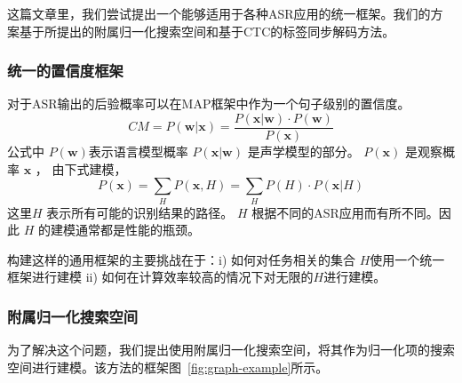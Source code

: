 这篇文章里，我们尝试提出一个能够适用于各种ASR应用的统一框架。我们的方案基于所提出的附属归一化搜索空间和基于CTC的标签同步解码方法。

  \subsubsection{统一的置信度框架}
  对于ASR输出的后验概率可以在MAP框架中作为一个句子级别的置信度。
  \begin{equation}\label{eq:cm-post}
        CM=P(\mathbf{w}|\mathbf{x}) =
         \frac{P(\mathbf{x}|\mathbf{w})\cdot P(\mathbf{w})}{P(\mathbf{x})}
  \end{equation}
 公式中 $P(\mathbf{w})$表示语言模型概率 $P(\mathbf{x}|\mathbf{w})$  是声学模型的部分。 $P(\mathbf{x})$ 是观察概率 $\mathbf{x}$ ， 由下式建模，
   \begin{equation}\label{eq:cm-obser}
        P(\mathbf{x})=\sum_H P(\mathbf{x},H)= \sum_H P(H) \cdot  P(\mathbf{x}|H)
  \end{equation}
 这里$H$ 表示所有可能的识别结果的路径。 $H$ 根据不同的ASR应用而有所不同。因此 $H$ 的建模通常都是性能的瓶颈。

构建这样的通用框架的主要挑战在于：i) 如何对任务相关的集合 $H$使用一个统一框架进行建模 ii) 如何在计算效率较高的情况下对无限的$H$进行建模。


 \subsubsection{附属归一化搜索空间}
 \label{Sec:norm-graph-detail}

 为了解决这个问题，我们提出使用附属归一化搜索空间，将其作为归一化项的搜索空间进行建模。该方法的框架图~\ref{fig:graph-example}所示。 

